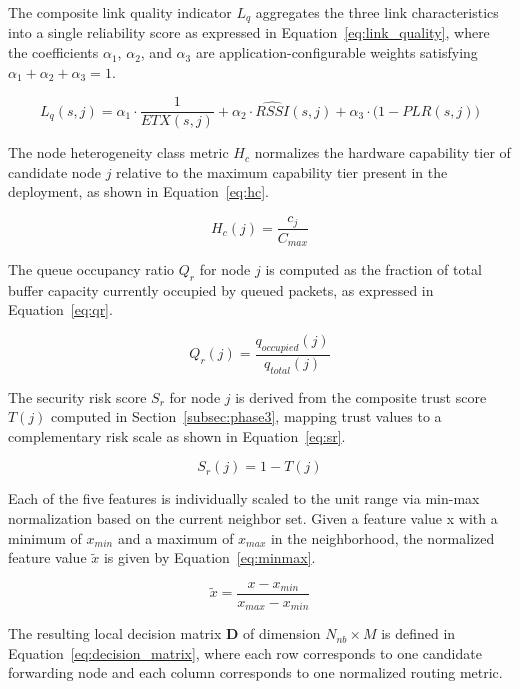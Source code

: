 \documentclass[a4paper,fleqn]{cas-dc}
\numberwithin{equation}{section}
\begin{document}
The composite link quality indicator $L_q$ aggregates the three
link characteristics into a single reliability score as expressed
in Equation~\ref{eq:link_quality}, where the coefficients
$\alpha_1$, $\alpha_2$, and $\alpha_3$ are application-configurable
weights satisfying $\alpha_1 + \alpha_2 + \alpha_3 = 1$.

\begin{equation}
\label{eq:link_quality}
L_q(s, j) = \alpha_1 \cdot \frac{1}{ETX(s,j)}
           + \alpha_2 \cdot \widehat{RSSI}(s,j)
           + \alpha_3 \cdot \bigl(1 - PLR(s,j)\bigr)
\end{equation}

The node heterogeneity class metric $H_c$ normalizes the hardware
capability tier of candidate node $j$ relative to the maximum
capability tier present in the deployment, as shown in
Equation~\ref{eq:hc}.

\begin{equation}
\label{eq:hc}
H_c(j) = \frac{c_j}{C_{max}}
\end{equation}

The queue occupancy ratio $Q_r$ for node $j$ is computed as the
fraction of total buffer capacity currently occupied by queued
packets, as expressed in Equation~\ref{eq:qr}.

\begin{equation}
\label{eq:qr}
Q_r(j) = \frac{q_{occupied}(j)}{q_{total}(j)}
\end{equation}

The security risk score $S_r$ for node $j$ is derived from the
composite trust score $T(j)$ computed in
Section~\ref{subsec:phase3}, mapping trust values to a complementary
risk scale as shown in Equation~\ref{eq:sr}.

\begin{equation}
\label{eq:sr}
S_r(j) = 1 - T(j)
\end{equation}

Each of the five features is individually scaled to the unit range
via min-max normalization based on the current neighbor set. Given a feature value x with a minimum of $x_{min}$ and a maximum of $x_{max}$ in the neighborhood, the normalized feature value $\tilde{x}$ is given by Equation~\ref{eq:minmax}.

\begin{equation}
\label{eq:minmax}
\tilde{x} = \frac{x - x_{min}}{x_{max} - x_{min}}
\end{equation}

The resulting local decision matrix $\mathbf{D}$ of dimension
$N_{nb} \times M$ is defined in Equation~\ref{eq:decision_matrix},
where each row corresponds to one candidate forwarding node and each
column corresponds to one normalized routing metric.
\end{document}
